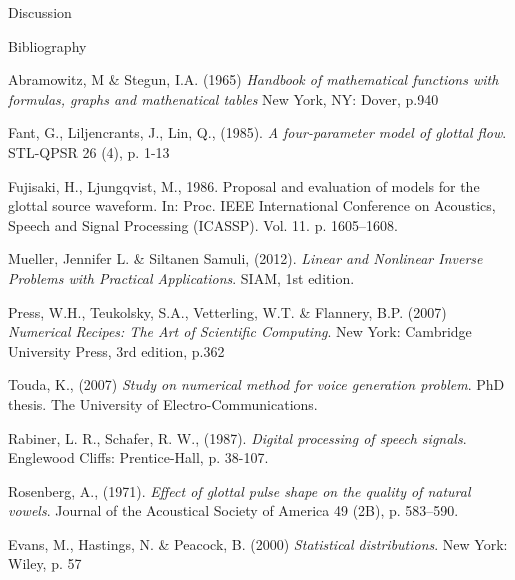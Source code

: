 \documentclass[final]{beamer}
\begin{document}
\begin{frame}[t]
\begin{columns}[t]
\begin{column}{.465\textwidth}
\begin{block}{Discussion}
\begin{itemize}
\end{itemize}

\end{block}


\begin{block}{Bibliography}

\begin{scriptsize}


\begin{thebibliography}{9}

    Abramowitz, M \& Stegun, I.A. (1965)
    \emph{Handbook of mathematical functions with formulas, graphs and mathenatical tables}
    New York, NY: Dover, p.940

    Fant, G., Liljencrants, J., Lin, Q., (1985).
    \emph{A four-parameter model of glottal flow}.
    STL-QPSR 26 (4), p. 1-13
    
    Fujisaki, H., Ljungqvist, M., 1986.
    Proposal and evaluation of models for the glottal source waveform.
    In: Proc. IEEE International Conference on Acoustics, Speech and Signal Processing (ICASSP). Vol. 11. p. 1605–1608.
    
	Mueller, Jennifer L. \& Siltanen Samuli, (2012).
	\emph{Linear and Nonlinear Inverse Problems with Practical Applications}.
	SIAM, 1st edition.
    
    Press, W.H., Teukolsky, S.A., Vetterling, W.T. \& Flannery, B.P. (2007)
    \emph{Numerical Recipes: The Art of Scientific Computing}.
    New York: Cambridge University Press, 3rd edition, p.362
	
    Touda, K., (2007)
    \emph{Study on numerical method for voice generation problem}.
    PhD thesis.
    The University of Electro-Communications.
    
    Rabiner, L. R., Schafer, R. W., (1987).
    \emph{Digital processing of speech signals}.
    Englewood Cliffs: Prentice-Hall, p. 38-107.

    Rosenberg, A., (1971).
    \emph{Effect of glottal pulse shape on the quality of natural vowels}.
    Journal of the Acoustical Society of America 49 (2B), p. 583–590.
    
    Evans, M., Hastings, N. \& Peacock, B. (2000)
    \emph{Statistical distributions}.
    New York: Wiley, p. 57


\end{thebibliography}
\end{scriptsize}
\end{block}
\end{column}
\end{columns}
\end{frame}
\end{document}
